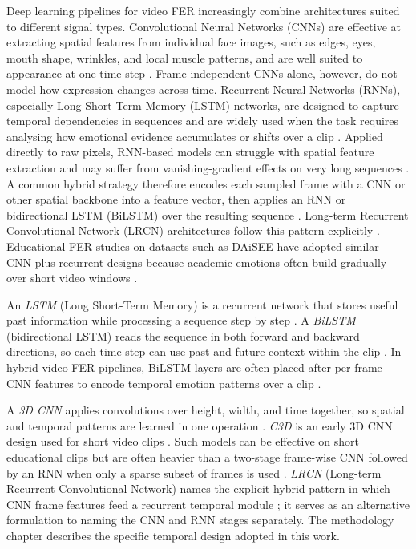 Deep learning pipelines for video FER increasingly combine architectures suited to different signal types. Convolutional Neural Networks (CNNs) are effective at extracting spatial features from individual face images, such as edges, eyes, mouth shape, wrinkles, and local muscle patterns, and are well suited to appearance at one time step \cite{aly_revolutionizing_2025,rao_recognition_2021}. Frame-independent CNNs alone, however, do not model how expression changes across time. Recurrent Neural Networks (RNNs), especially Long Short-Term Memory (LSTM) networks, are designed to capture temporal dependencies in sequences and are widely used when the task requires analysing how emotional evidence accumulates or shifts over a clip \cite{hochreiter_lstm_1997,leong_deep_2020}. Applied directly to raw pixels, RNN-based models can struggle with spatial feature extraction and may suffer from vanishing-gradient effects on very long sequences \cite{hochreiter_lstm_1997}. A common hybrid strategy therefore encodes each sampled frame with a CNN or other spatial backbone into a feature vector, then applies an RNN or bidirectional LSTM (BiLSTM) over the resulting sequence \cite{gupta_daisee_2016,asaju_adaptive_2022}. Long-term Recurrent Convolutional Network (LRCN) architectures follow this pattern explicitly \cite{gupta_daisee_2016}. Educational FER studies on datasets such as DAiSEE have adopted similar CNN-plus-recurrent designs because academic emotions often build gradually over short video windows \cite{rao_recognition_2021,asaju_adaptive_2022,mehta_three-dimensional_2022,leong_deep_2020,gupta_daisee_2016}.

An \emph{LSTM} (Long Short-Term Memory) is a recurrent network that stores useful past information while processing a sequence step by step \cite{hochreiter_lstm_1997,leong_deep_2020}. A \emph{BiLSTM} (bidirectional LSTM) reads the sequence in both forward and backward directions, so each time step can use past and future context within the clip \cite{asaju_adaptive_2022,tulsani_realtime_2025}. In hybrid video FER pipelines, BiLSTM layers are often placed after per-frame CNN features to encode temporal emotion patterns over a clip \cite{asaju_adaptive_2022,leong_deep_2020}.

A \emph{3D CNN} applies convolutions over height, width, and time together, so spatial and temporal patterns are learned in one operation \cite{mehta_three-dimensional_2022}. \emph{C3D} is an early 3D CNN design used for short video clips \cite{gupta_daisee_2016}. Such models can be effective on short educational clips but are often heavier than a two-stage frame-wise CNN followed by an RNN when only a sparse subset of frames is used \cite{mehta_three-dimensional_2022,abedi_improving_2021}. \emph{LRCN} (Long-term Recurrent Convolutional Network) names the explicit hybrid pattern in which CNN frame features feed a recurrent temporal module \cite{gupta_daisee_2016}; it serves as an alternative formulation to naming the CNN and RNN stages separately. The methodology chapter describes the specific temporal design adopted in this work.

